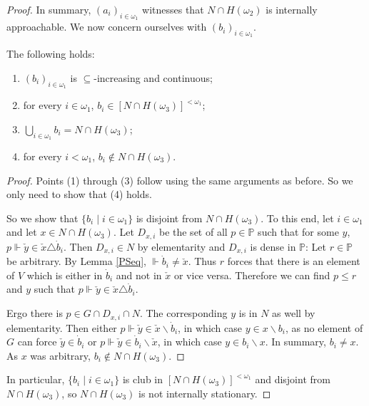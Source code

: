\documentclass[10pt,a4paper]{amsart}
\newcommand{\dP}{\mathbb{P}}
\begin{document}
\begin{proof}
		In summary, $(a_i)_{i\in\omega_1}$ witnesses that $N\cap H(\omega_2)$ is internally approachable. We now concern ourselves with $(b_i)_{i\in\omega_1}$.
		
		\begin{myclaim}
			The following holds:
			\begin{enumerate}
				\item $(b_i)_{i\in\omega_1}$ is $\subseteq$-increasing and continuous;
				\item for every $i\in\omega_1$, $b_i\in[N\cap H(\omega_3)]^{<\omega_1}$;
				\item $\bigcup_{i\in\omega_1}b_i=N\cap H(\omega_3)$;
				\item for every $i<\omega_1$, $b_i\notin N\cap H(\omega_3)$.
			\end{enumerate}
		\end{myclaim}
		
		\begin{proof}
			Points (1) through (3) follow using the same arguments as before. So we only need to show that (4) holds.
			
			So we show that $\{b_i\;|\;i\in\omega_1\}$ is disjoint from $N\cap H(\omega_3)$. To this end, let $i\in\omega_1$ and let $x\in N\cap H(\omega_3)$. Let $D_{x,i}$ be the set of all $p\in\dP$ such that for some $y$, $p\Vdash \check{y}\in\check{x}\triangle\dot{b}_i$. Then $D_{x,i}\in N$ by elementarity and $D_{x,i}$ is dense in $\dP$: Let $r\in\dP$ be arbitrary. By Lemma \ref{PSeq}, $\Vdash\dot{b}_i\neq\check{x}$. Thus $r$ forces that there is an element of $V$ which is either in $\dot{b}_i$ and not in $\check{x}$ or vice versa. Therefore we can find $p\leq r$ and $y$ such that $p\Vdash\check{y}\in\check{x}\triangle\dot{b}_i$.
			
			Ergo there is $p\in G\cap D_{x,i}\cap N$. The corresponding $y$ is in $N$ as well by elementarity. Then either $p\Vdash\check{y}\in\check{x}\smallsetminus\dot{b}_i$, in which case $y\in x\smallsetminus b_i$, as no element of $G$ can force $\check{y}\in\dot{b}_i$ or $p\Vdash\check{y}\in\dot{b}_i\smallsetminus\check{x}$, in which case $y\in b_i\smallsetminus x$. In summary, $b_i\neq x$. As $x$ was arbitrary, $b_i\notin N\cap H(\omega_3)$.
		\end{proof}
		
		In particular, $\{b_i\;|\;i\in\omega_1\}$ is club in $[N\cap H(\omega_3)]^{<\omega_1}$ and disjoint from $N\cap H(\omega_3)$, so $N\cap H(\omega_3)$ is not internally stationary.
	\end{proof}
\end{document}
